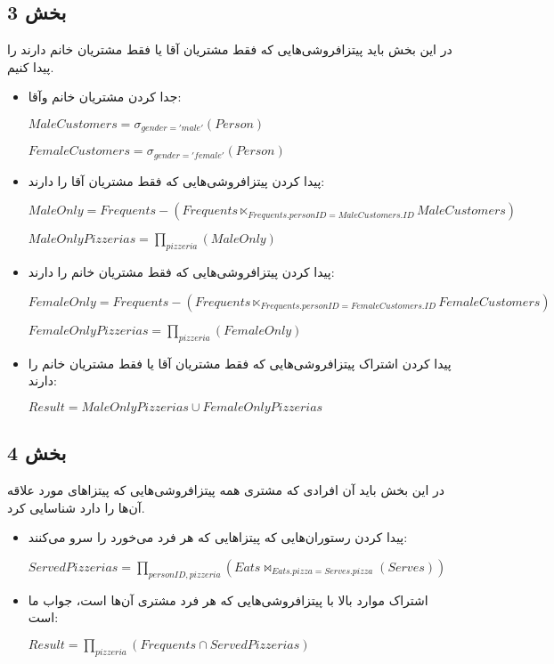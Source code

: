 \subsection*{بخش 3}
در این بخش باید پیتزافروشی‌هایی که فقط مشتریان آقا یا فقط مشتریان خانم دارند را پیدا کنیم.
\begin{itemize}	
	\item جدا کردن مشتریان خانم وآقا:
	
	\setLTR
	$MaleCustomers = \sigma_{gender = 'male'} (Person)$
	
	$FemaleCustomers = \sigma_{gender = 'female'} (Person)$
	\setRTL
	
	\item پیدا کردن پیتزافروشی‌هایی که فقط مشتریان آقا را دارند:
	
		\setLTR
$MaleOnly = Frequents - (Frequents \ltimes_{Frequents.personID=MaleCustomers.ID} MaleCustomers)$

$MaleOnlyPizzerias = \prod_{pizzeria} (MaleOnly)$
	\setRTL
	
		\item پیدا کردن پیتزافروشی‌هایی که فقط مشتریان خانم را دارند:
	
	\setLTR
	$FemaleOnly = Frequents - (Frequents \ltimes_{Frequents.personID=FemaleCustomers.ID} FemaleCustomers)$
	
	$FemaleOnlyPizzerias = \prod_{pizzeria} (FemaleOnly)$
	\setRTL
	
	\item پیدا کردن اشتراک پیتزافروشی‌هایی که فقط مشتریان آقا یا فقط مشتریان خانم را دارند:
	
		\setLTR
	$Result = MaleOnlyPizzerias \cup FemaleOnlyPizzerias$
	\setRTL
	
	
\end{itemize}

\subsection*{بخش 4}
در این بخش باید آن افرادی که مشتری همه پیتزافروشی‌هایی که پیتزاهای مورد علاقه آن‌ها را دارد شناسایی کرد.
\begin{itemize}	
		\item پیدا کردن رستوران‌هایی که پیتزاهایی که هر فرد می‌خورد را سرو می‌کنند:
		
	
	\setLTR
	$ServedPizzerias=\prod_{personID,pizzeria}(Eats\bowtie_{Eats.pizza=Serves.pizza}(Serves))$
	\setRTL
	
	\item اشتراک موارد بالا با پیتزافروشی‌هایی که هر فرد مشتری آن‌ها است، جواب ما است:
	
	\setLTR
	$Result = \prod_{pizzeria} (Frequents \cap ServedPizzerias)$
	\setRTL

	

\end{itemize}

